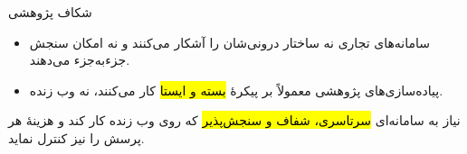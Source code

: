 \begin{frame}{شکاف پژوهشی}
  \begin{PTcons}
    \begin{itemize}
      \item سامانه‌های تجاری نه ساختار درونی‌شان را آشکار می‌کنند و نه امکان
            سنجش جزء‌به‌جزء می‌دهند.
      \item پیاده‌سازی‌های پژوهشی معمولاً بر پیکرهٔ \hl{بسته و ایستا} کار می‌کنند،
            نه وب زنده.
    \end{itemize}
  \end{PTcons}

  \begin{PTresult}
    نیاز به سامانه‌ای \hl{سرتاسری، شفاف و سنجش‌پذیر} که روی وب زنده کار کند و
    هزینهٔ هر پرسش را نیز کنترل نماید.
  \end{PTresult}
\end{frame}
